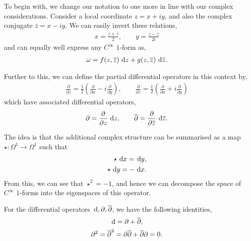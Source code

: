 To begin with, we change our notation to one more in line with our complex
considerations. Consider a local coordinate $ z = x+iy $, and also the complex
conjugate $ \overline{z} = x - i y $. We can easily invert these relations,
\begin{align*}
	x = \frac{z + \overline{z}}{2},\qquad y = \frac{z - \overline{z}}{2i}
\end{align*}
and can equally well express any $ C ^{\infty} $ $ 1 $-form as,
\begin{align*}
	\omega = f(z, \overline{z}) \operatorname{\, d\!}{z} + g(z, \overline{z})\operatorname{\, d\!}{\overline{z}}.
\end{align*}

Further to this, we can define the partial differential operators in this
context by,
\begin{align*}
	\frac{\partial }{\partial z} = \frac{1}{2} \left( \frac{\partial }{\partial
		x}-i \frac{\partial }{\partial y} \right), \qquad
	\frac{\partial }{\partial \overline{z}} = \frac{1}{2}\left(
	\frac{\partial }{\partial x}+ i \frac{\partial }{\partial y} \right)
\end{align*}
which have associated differential operators,
\begin{align*}
	\partial = \frac{\partial }{\partial z}\operatorname{\, d\!}{z},\qquad
	\overline{\partial} = \frac{\partial }{\partial \overline{z}}\operatorname{\, d\!}{\overline{z}}.
\end{align*}

\begin{remark}
	The idea is that the additional complex structure can be summarised as a
	map $ \star: \Omega^1 \to \Omega^1 $ such that
	\begin{align*}
		\star \operatorname{\, d\!}{x} = \operatorname{\, d\!}{y}, \\
		\star \operatorname{\, d\!}{y} = - \operatorname{\, d\!}{x}.
	\end{align*}
	From this, we can see that $ \star^2=-1 $, and hence we can decompose the
	space of $ C ^{\infty} $ $ 1 $-forms into the eigenspaces of this operator.
\end{remark}

\begin{lemma}
	For the differential operators $ \operatorname{\, d\!}{}, \partial, \overline{\partial} $, we
	have the following identities,
	\begin{gather*}
		\operatorname{\, d\!}{} = \partial + \overline{\partial },\\
		\partial ^{2} = \overline{\partial }^{2} = \partial \overline{\partial }+
		\overline{\partial }\partial =0.
	\end{gather*}
\end{lemma}

